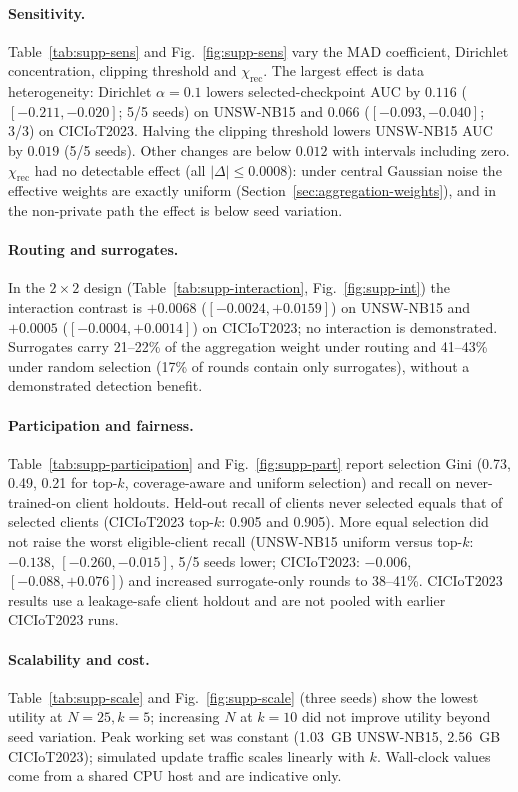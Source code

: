 \paragraph{Sensitivity.} Table~\ref{tab:supp-sens} and Fig.~\ref{fig:supp-sens} vary the MAD coefficient, Dirichlet concentration, clipping threshold and $\chi_{\mathrm{rec}}$. The largest effect is data heterogeneity: Dirichlet $\alpha=0.1$ lowers selected-checkpoint AUC by $0.116$ ($[-0.211,-0.020]$; 5/5 seeds) on UNSW-NB15 and $0.066$ ($[-0.093,-0.040]$; 3/3) on CICIoT2023. Halving the clipping threshold lowers UNSW-NB15 AUC by $0.019$ (5/5 seeds). Other changes are below $0.012$ with intervals including zero. $\chi_{\mathrm{rec}}$ had no detectable effect (all $|\Delta|\le 0.0008$): under central Gaussian noise the effective weights are exactly uniform (Section~\ref{sec:aggregation-weights}), and in the non-private path the effect is below seed variation.

\paragraph{Routing and surrogates.} In the $2\times2$ design (Table~\ref{tab:supp-interaction}, Fig.~\ref{fig:supp-int}) the interaction contrast is $+0.0068$ ($[-0.0024,+0.0159]$) on UNSW-NB15 and $+0.0005$ ($[-0.0004,+0.0014]$) on CICIoT2023; no interaction is demonstrated. Surrogates carry 21--22\% of the aggregation weight under routing and 41--43\% under random selection (17\% of rounds contain only surrogates), without a demonstrated detection benefit.

\paragraph{Participation and fairness.} Table~\ref{tab:supp-participation} and Fig.~\ref{fig:supp-part} report selection Gini (0.73, 0.49, 0.21 for top-$k$, coverage-aware and uniform selection) and recall on never-trained-on client holdouts. Held-out recall of clients never selected equals that of selected clients (CICIoT2023 top-$k$: 0.905 and 0.905). More equal selection did not raise the worst eligible-client recall (UNSW-NB15 uniform versus top-$k$: $-0.138$, $[-0.260,-0.015]$, 5/5 seeds lower; CICIoT2023: $-0.006$, $[-0.088,+0.076]$) and increased surrogate-only rounds to 38--41\%. CICIoT2023 results use a leakage-safe client holdout and are not pooled with earlier CICIoT2023 runs.

\paragraph{Scalability and cost.} Table~\ref{tab:supp-scale} and Fig.~\ref{fig:supp-scale} (three seeds) show the lowest utility at $N=25,k=5$; increasing $N$ at $k=10$ did not improve utility beyond seed variation. Peak working set was constant (1.03~GB UNSW-NB15, 2.56~GB CICIoT2023); simulated update traffic scales linearly with $k$. Wall-clock values come from a shared CPU host and are indicative only.

